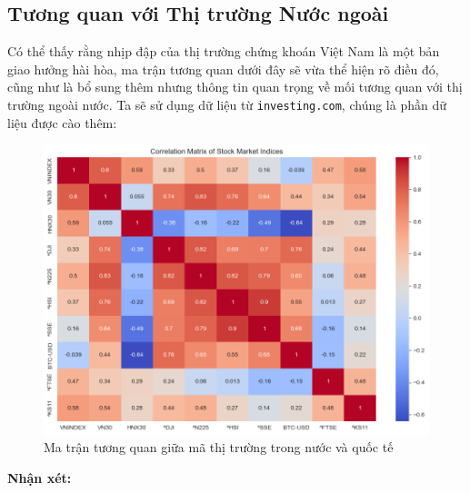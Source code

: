 \subsection{Tương quan với Thị trường Nước ngoài}
Có thể thấy rằng nhịp đập của thị trường chứng khoán Việt Nam là một bản giao hưởng hài hòa, ma trận tương quan dưới đây sẽ vừa thể hiện rõ điều đó, cũng như là bổ sung thêm nhưng thông tin quan trọng về mối tương quan với thị trường ngoài nước. Ta sẽ sử dụng dữ liệu từ \texttt{investing.com}, chúng là phần dữ liệu được cào thêm:
\begin{figure}[H]
    \centering
    \includegraphics[width=1\linewidth]{images/plot-2.9-heatmap.png}
    \vspace{-1em}
    \caption{Ma trận tương quan giữa mã thị trường trong nước và quốc tế}
    \label{fig:3.5}
\end{figure}

\textbf{Nhận xét:}

